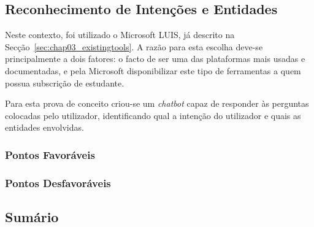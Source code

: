 \subsection{Reconhecimento de Intenções e Entidades}
Neste contexto, foi utilizado o Microsoft LUIS, já descrito na Secção~\ref{sec:chap03_existingtools}. A razão para esta escolha deve-se principalmente a dois fatores: o facto de ser uma das plataformas mais usadas e documentadas, e pela Microsoft disponibilizar este tipo de ferramentas a quem possua subscrição de estudante.

Para esta prova de conceito criou-se um \textit{chatbot} capaz de responder às perguntas colocadas pelo utilizador, identificando qual a intenção do utilizador e quais as entidades envolvidas.

\subsubsection*{Pontos Favoráveis}
\tbd

\subsubsection*{Pontos Desfavoráveis}
\tbd

\subsection{Sumário}
\tbd
